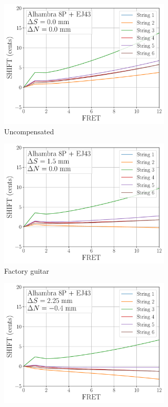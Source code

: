   \begin{figure}
  \centering
  \begin{subfigure}[b]{0.45\textwidth}
   \centering
   \includegraphics[width=3.25in]{figures/shift_alhambra8p_ej43_null}
   \caption{Uncompensated}
   \label{fig:shift_alhambra8p_ej43_null}
  \end{subfigure}
  \hspace{0.25in}
  \begin{subfigure}[b]{0.45\textwidth}
   \centering
   \includegraphics[width=3.25in]{figures/shift_alhambra8p_ej43_factory}
   \caption{Factory guitar}
   \label{fig:shift_alhambra8p_ej43_factory}
  \end{subfigure}
  \par\vspace{0.25in}
  \begin{subfigure}[b]{0.45\textwidth}
   \centering
   \includegraphics[width=3.25in]{figures/shift_alhambra8p_ej43_mean}

\end{subfigure}
\end{figure}
